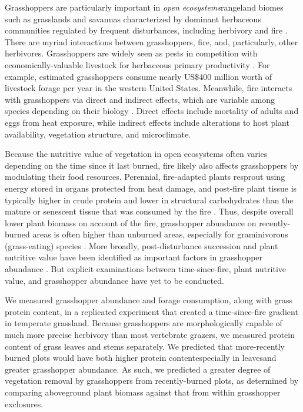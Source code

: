 \documentclass[referee, 
	            sn-basic]
           {sn-jnl}
\begin{document}
Grasshoppers are particularly important in \emph{open ecosystems}\textemdash rangeland biomes such as grasslands and savannas characterized by dominant herbaceous communities regulated by frequent disturbances, including herbivory and fire \citep{bond2022}. 
There are myriad interactions between grasshoppers, fire, and, particularly, other herbivores. 
Grasshoppers are widely seen as pests in competition with economically-valuable livestock for herbaceous primary productivity \citep{zhang2019}. 
For example, \citet{hewitt1983} estimated grasshoppers consume nearly US\$400 million worth of livestock forage per year in the western United States. 
Meanwhile, fire interacts with grasshoppers via direct and indirect effects, which are variable among species depending on their biology \citep[e.g.][]{vermeire2004}. 
Direct effects include mortality of adults and eggs from heat exposure, while indirect effects include alterations to host plant availability, vegetation structure, and microclimate. 

Because the nutritive value of vegetation in open ecosystems often varies depending on the time since it last burned, fire likely also affects grasshoppers by modulating their food resources. 
Perennial, fire-adapted plants resprout using energy stored in organs protected from heat damage, and post-fire plant tissue is typically higher in crude protein and lower in structural carbohydrates than the mature or senescent tissue that was consumed by the fire \citep{mcgranahan2021}. 
Thus, despite overall lower plant biomass on account of the fire, grasshopper abundance on recently-burned areas is often higher than unburned areas, especially for graminivorous (grass-eating) species \citep{meyer2002}. 
More broadly, post-disturbance succession and plant nutritive value have been identified as important factors in grasshopper abundance \citep{fartmann2012, schirmel2019}. 
But explicit examinations between time-since-fire, plant nutritive value, and grasshopper abundance have yet to be conducted. 

We measured grasshopper abundance and forage consumption, along with grass protein content, in a replicated experiment that created a time-since-fire gradient in temperate grassland.  
Because grasshoppers are morphologically capable of much more precise herbivory than most vertebrate grazers, we measured protein content of grass leaves and stems separately.
We predicted that more-recently burned plots would have both higher protein content\textemdash especially in leaves\textemdash and greater grasshopper abundance. 
As such, we predicted a greater degree of vegetation removal by grasshoppers from recently-burned plots, as determined by comparing aboveground plant biomass against that from within grasshopper exclosures. 
\end{document}
